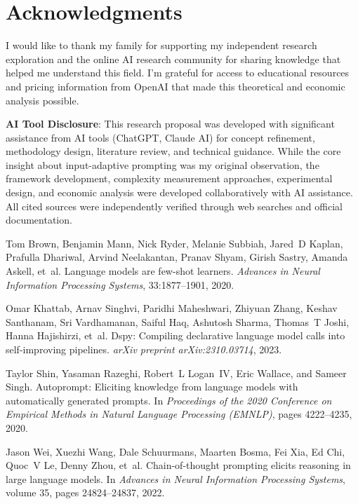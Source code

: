 \documentclass[11pt,a4paper]{article}
\begin{document}
\section*{Acknowledgments}

I would like to thank my family for supporting my independent research exploration and the online AI research community for sharing knowledge that helped me understand this field. I'm grateful for access to educational resources and pricing information from OpenAI that made this theoretical and economic analysis possible.

\textbf{AI Tool Disclosure}: This research proposal was developed with significant assistance from AI tools (ChatGPT, Claude AI) for concept refinement, methodology design, literature review, and technical guidance. While the core insight about input-adaptive prompting was my original observation, the framework development, complexity measurement approaches, experimental design, and economic analysis were developed collaboratively with AI assistance. All cited sources were independently verified through web searches and official documentation.


\begin{thebibliography}{10}

Tom Brown, Benjamin Mann, Nick Ryder, Melanie Subbiah, Jared~D Kaplan, Prafulla Dhariwal, Arvind Neelakantan, Pranav Shyam, Girish Sastry, Amanda Askell, et~al.
\newblock Language models are few-shot learners.
\newblock \emph{Advances in Neural Information Processing Systems}, 33:1877--1901, 2020.

Omar Khattab, Arnav Singhvi, Paridhi Maheshwari, Zhiyuan Zhang, Keshav Santhanam, Sri Vardhamanan, Saiful Haq, Ashutosh Sharma, Thomas~T Joshi, Hanna Hajishirzi, et~al.
\newblock Dspy: Compiling declarative language model calls into self-improving pipelines.
\newblock \emph{arXiv preprint arXiv:2310.03714}, 2023.

Taylor Shin, Yasaman Razeghi, Robert~L Logan~IV, Eric Wallace, and Sameer Singh.
\newblock Autoprompt: Eliciting knowledge from language models with automatically generated prompts.
\newblock In \emph{Proceedings of the 2020 Conference on Empirical Methods in Natural Language Processing (EMNLP)}, pages 4222--4235, 2020.

Jason Wei, Xuezhi Wang, Dale Schuurmans, Maarten Bosma, Fei Xia, Ed Chi, Quoc~V Le, Denny Zhou, et~al.
\newblock Chain-of-thought prompting elicits reasoning in large language models.
\newblock In \emph{Advances in Neural Information Processing Systems}, volume 35, pages 24824--24837, 2022.

\end{thebibliography}
\end{document}
